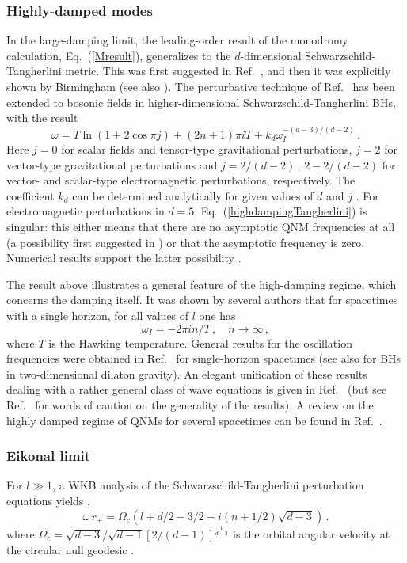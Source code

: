 \documentclass[]{iopart}
\def\be{\begin{equation}}
\def\ee{\end{equation}}
\begin{document}
\subsubsection*{Highly-damped modes} In the large-damping limit, the leading-order
result of the monodromy calculation, Eq.~(\ref{Mresult}), generalizes to the
$d$-dimensional Schwarzschild-Tangherlini metric.  This was first suggested in
Ref.~\cite{Motl:2003cd}, and then it was explicitly shown by Birmingham
\cite{Birmingham:2003rf} (see also \cite{Kunstatter:2002pj}). The perturbative
technique of Ref.~\cite{Musiri:2003bv} has been extended to bosonic fields in
higher-dimensional Schwarzschild-Tangherlini BHs, with the result
\cite{Cardoso:2003vt}
%
\be  \label{highdampingTangherlini}
\omega=T \ln (1+2\cos\pi j)+(2n+1)\pi i T +k_d\omega_I^{-(d-3)/(d-2)}\,.
\ee
%
Here $j=0$ for scalar fields and tensor-type gravitational perturbations,
$j=2$ for vector-type gravitational perturbations and
$j=2/(d-2)\,,\,2-2/(d-2)$ for vector- and scalar-type electromagnetic
perturbations, respectively. The coefficient $k_d$ can be determined
analytically for given values of $d$ and $j$ \cite{Cardoso:2003vt}. For
electromagnetic perturbations in $d=5$, Eq.~(\ref{highdampingTangherlini}) is
singular: this either means that there are no asymptotic QNM frequencies at
all (a possibility first suggested in \cite{Motl:2003cd}) or that the
asymptotic frequency is zero. Numerical results support the latter possibility
\cite{Cardoso:2003vt}.

The result above illustrates a general feature of the high-damping regime,
which concerns the damping itself. It was shown by several authors
\cite{Medved:2003rga,Medved:2003pr,Padmanabhan:2003fx} that for spacetimes
with a single horizon, for all values of $l$ one has
% 
\be
\omega_I=-2\pi in /T\,,\quad n\rightarrow \infty\,,
\label{imwqnmgen}
\ee
%
where $T$ is the Hawking temperature. General results for the oscillation
frequencies were obtained in Ref.~\cite{Das:2004db} for single-horizon
spacetimes (see also \cite{Kettner:2004aw} for BHs in two-dimensional dilaton
gravity).  An elegant unification of these results dealing with a rather
general class of wave equations is given in Ref.~\cite{Daghigh:2005ph} (but
see Ref.~\cite{Daghigh:2006xg} for words of caution on the generality of the
results). A review on the highly damped regime of QNMs for several spacetimes
can be found in Ref.~\cite{Natario:2004jd}.

\subsubsection*{Eikonal limit} For $l \gg 1$, a WKB analysis of the
Schwarzschild-Tangherlini perturbation equations yields
\cite{Konoplya:2003ii,Cardoso:2008bp},
%
\be
\omega\,r_+=\Omega_c
\left (l+d/2-3/2-i(n+1/2)\sqrt{d-3}\right )\,.
\ee
%  
where $\Omega_c=\sqrt{d-3}/\sqrt{d-1}\left [2/(d-1)\right ]^{\frac{1}{d-3}}$
is the orbital angular velocity at the circular null geodesic
\cite{Cardoso:2008bp}.
\end{document}
